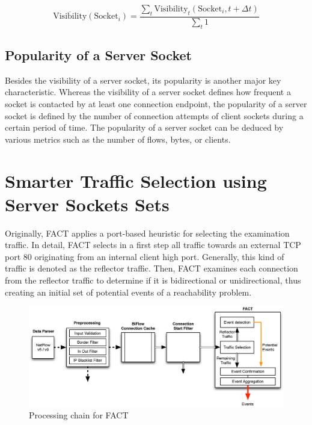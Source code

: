 \begin{equation}
	\overline{\text{Visibility}}(\text{Socket}_i) = \frac{\sum_{t} \text{Visibility}_t(\text{Socket}_i,t+\Delta{t})}{\sum_{t}1}
	\label{eq:visibility_avg}
\end{equation}

\subsection{Popularity of a Server Socket}

Besides the visibility of a \gls{server socket}, its popularity is another major key characteristic. 
Whereas the visibility of a \gls{server socket} defines how frequent a socket is contacted by at least one connection endpoint, the popularity of a \gls{server socket} is defined by the number of connection attempts of client sockets during a certain period of time. 
The popularity of a \gls{server socket} can be deduced by various metrics such as the number of flows, bytes, or clients.

\newpage
\section{Smarter Traffic Selection using Server Sockets Sets 
\label{section:ses_traffic_selection}}

Originally, \gls{FACT} applies a port-based heuristic for selecting the  examination traffic.  
In detail, \gls{FACT} selects in a first step all traffic towards an external  \gls{TCP} port 80 originating from an internal client high port. 
Generally, this kind of traffic is denoted as the reflector traffic. 
Then, \gls{FACT} examines each connection from the reflector traffic to determine if it is  bidirectional or unidirectional, thus creating an initial set of potential events of a reachability problem. 

\begin{figure}
	[!b] \centering
	\includegraphics[width=\linewidth]{images/FACT.eps}
	\caption{Processing chain for FACT} 
	\label{fig:fact_chain} 
\end{figure}

